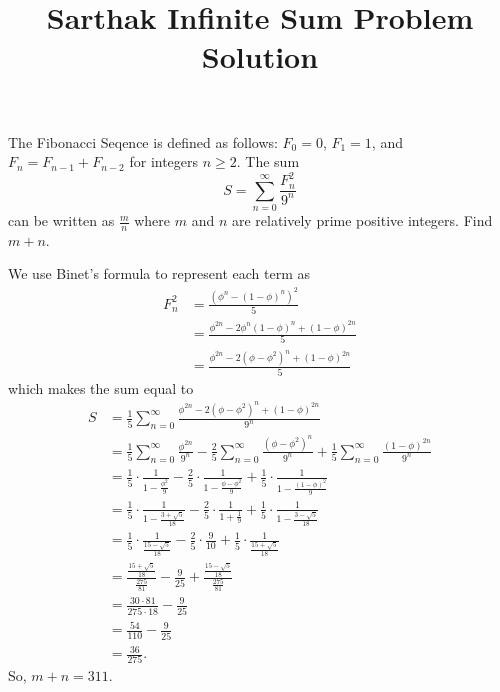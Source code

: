 \documentclass[11pt]{scrartcl}
\title{Sarthak Infinite Sum Problem Solution}
\begin{document}
\begin{problem}
    The Fibonacci Seqence is defined as follows: $F_{0} = 0$, $F_{1} = 1$, and $F_{n} = F_{n - 1} + F_{n - 2}$ for integers $n \geq 2$. The sum
    \[S = \sum_{n = 0}^{\infty} \frac{F_{n}^{2}}{9^{n}}\]
    can be written as $\frac{m}{n}$ where $m$ and $n$ are relatively prime positive integers. Find $m + n$.
\end{problem}

\begin{soln}
    We use Binet's formula to represent each term as
    \begin{align*}
        F_{n}^{2} &= \frac{(\phi^{n} - (1 - \phi)^{n})^{2}}{5} \\
        &= \frac{\phi^{2n} - 2\phi^{n}(1 - \phi)^{n} + (1 - \phi)^{2n}}{5} \\
        &= \frac{\phi^{2n} - 2(\phi - \phi^{2})^{n} + (1 - \phi)^{2n}}{5}
    \end{align*}
    which makes the sum equal to
    \begin{align*}
        S &= \frac{1}{5}\sum_{n = 0}^{\infty} \frac{\phi^{2n} - 2(\phi - \phi^{2})^{n} + (1 - \phi)^{2n}}{9^{n}} \\
        &= \frac{1}{5}\sum_{n = 0}^{\infty} \frac{\phi^{2n}}{9^{n}} - \frac{2}{5}\sum_{n = 0}^{\infty} \frac{(\phi - \phi^{2})^{n}}{9^{n}} + \frac{1}{5}\sum_{n = 0}^{\infty} \frac{(1 - \phi)^{2n}}{9^{n}} \\
        &= \frac{1}{5} \cdot \frac{1}{1 - \frac{\phi^{2}}{9}} - \frac{2}{5} \cdot \frac{1}{1 - \frac{\phi - \phi^{2}}{9}} + \frac{1}{5} \cdot \frac{1}{1 - \frac{(1 - \phi)^{2}}{9}} \\
        &= \frac{1}{5} \cdot \frac{1}{1 - \frac{3 + \sqrt{5}}{18}} - \frac{2}{5} \cdot \frac{1}{1 + \frac{1}{9}} + \frac{1}{5} \cdot \frac{1}{1 - \frac{3 - \sqrt{5}}{18}} \\
        &= \frac{1}{5} \cdot \frac{1}{\frac{15 - \sqrt{5}}{18}} - \frac{2}{5} \cdot \frac{9}{10} + \frac{1}{5} \cdot \frac{1}{\frac{15 + \sqrt{5}}{18}} \\
        &= \frac{\frac{15 + \sqrt{5}}{18}}{\frac{275}{81}} - \frac{9}{25} + \frac{\frac{15 - \sqrt{5}}{18}}{\frac{275}{81}} \\
        &= \frac{30 \cdot 81}{275 \cdot 18} - \frac{9}{25} \\
        &= \frac{54}{110} - \frac{9}{25} \\
        &= \frac{36}{275}.
    \end{align*}
    So, $m + n = 311$.
\end{soln}
\end{document}
